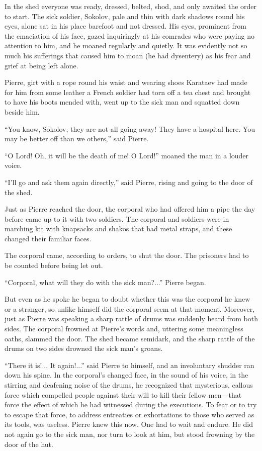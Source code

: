 In the shed everyone was ready, dressed, belted, shod, and only
awaited the order to start. The sick soldier, Sokolov, pale and
thin with dark shadows round his eyes, alone sat in his place
barefoot and not dressed.  His eyes, prominent from the
emaciation of his face, gazed inquiringly at his comrades who
were paying no attention to him, and he moaned regularly and
quietly. It was evidently not so much his sufferings that caused
him to moan (he had dysentery) as his fear and grief at being
left alone.

Pierre, girt with a rope round his waist and wearing shoes
Karataev had made for him from some leather a French soldier had
torn off a tea chest and brought to have his boots mended with,
went up to the sick man and squatted down beside him.

``You know, Sokolov, they are not all going away! They have a
hospital here. You may be better off than we others,'' said
Pierre.

``O Lord! Oh, it will be the death of me! O Lord!'' moaned the
man in a louder voice.

``I'll go and ask them again directly,'' said Pierre, rising and
going to the door of the shed.

Just as Pierre reached the door, the corporal who had offered him
a pipe the day before came up to it with two soldiers. The
corporal and soldiers were in marching kit with knapsacks and
shakos that had metal straps, and these changed their familiar
faces.

The corporal came, according to orders, to shut the door. The
prisoners had to be counted before being let out.

``Corporal, what will they do with the sick man?...'' Pierre
began.

But even as he spoke he began to doubt whether this was the
corporal he knew or a stranger, so unlike himself did the
corporal seem at that moment. Moreover, just as Pierre was
speaking a sharp rattle of drums was suddenly heard from both
sides. The corporal frowned at Pierre's words and, uttering some
meaningless oaths, slammed the door. The shed became semidark,
and the sharp rattle of the drums on two sides drowned the sick
man's groans.

``There it is!... It again!...'' said Pierre to himself, and an
involuntary shudder ran down his spine. In the corporal's changed
face, in the sound of his voice, in the stirring and deafening
noise of the drums, he recognized that mysterious, callous force
which compelled people against their will to kill their fellow
men---that force the effect of which he had witnessed during the
executions. To fear or to try to escape that force, to address
entreaties or exhortations to those who served as its tools, was
useless. Pierre knew this now. One had to wait and endure. He did
not again go to the sick man, nor turn to look at him, but stood
frowning by the door of the hut.

